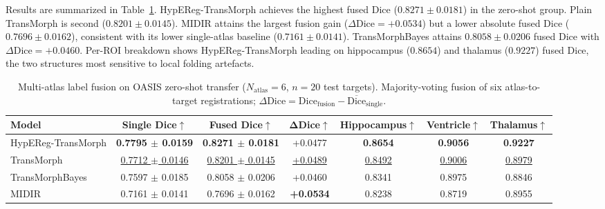 \documentclass[jimaging,article,submit,pdftex,moreauthors]{Definitions/mdpi}
\newcommand{\best}[1]{\textcolor{BestColor}{\textbf{#1}}}
\newcommand{\snd}[1]{\textcolor{SndColor}{\underline{#1}}}
\begin{document}
Results are summarized in Table~\ref{tab:multiatlas}. HypEReg-TransMorph achieves the highest fused Dice (\(0.8271\pm0.0181\)) in the zero-shot group. Plain TransMorph is second (\(0.8201\pm0.0145\)). MIDIR attains the largest fusion gain (\(\Delta\mathrm{Dice}=+0.0534\)) but a lower absolute fused Dice (\(0.7696\pm0.0162\)), consistent with its lower single-atlas baseline (\(0.7161\pm0.0141\)). TransMorphBayes attains \(0.8058\pm0.0206\) fused Dice with \(\Delta\mathrm{Dice}=+0.0460\). Per-ROI breakdown shows HypEReg-TransMorph leading on hippocampus (\(0.8654\)) and thalamus (\(0.9227\)) fused Dice, the two structures most sensitive to local folding artefacts.

\begin{table}[H]
\caption{Multi-atlas label fusion on OASIS zero-shot transfer (\(N_{\mathrm{atlas}}=6\), \(n=20\) test targets). Majority-voting fusion of six atlas-to-target registrations; \(\Delta\mathrm{Dice}=\mathrm{Dice}_{\mathrm{fusion}}-\overline{\mathrm{Dice}}_{\mathrm{single}}\).\label{tab:multiatlas}}
\centering
\scriptsize
\setlength{\tabcolsep}{3pt}
\begin{tabularx}{\textwidth}{lcccccc}
\toprule
\textbf{Model} & \textbf{Single Dice\(\uparrow\)} & \textbf{Fused Dice\(\uparrow\)} & \(\boldsymbol{\Delta}\)\textbf{Dice\(\uparrow\)} & \textbf{Hippocampus\(\uparrow\)} & \textbf{Ventricle\(\uparrow\)} & \textbf{Thalamus\(\uparrow\)}\\
\midrule
HypEReg-TransMorph & \best{0.7795 \(\pm\) 0.0159} & \best{0.8271 \(\pm\) 0.0181} & +0.0477 & \best{0.8654} & \best{0.9056} & \best{0.9227} \\
TransMorph & \snd{0.7712 \(\pm\) 0.0146} & \snd{0.8201 \(\pm\) 0.0145} & \snd{+0.0489} & \snd{0.8492} & \snd{0.9006} & \snd{0.8979} \\
TransMorphBayes & 0.7597 \(\pm\) 0.0185 & 0.8058 \(\pm\) 0.0206 & +0.0460 & 0.8341 & 0.8975 & 0.8846 \\
MIDIR & 0.7161 \(\pm\) 0.0141 & 0.7696 \(\pm\) 0.0162 & \best{+0.0534} & 0.8238 & 0.8719 & 0.8955 \\
\bottomrule
\end{tabularx}
\end{table}
\end{document}
